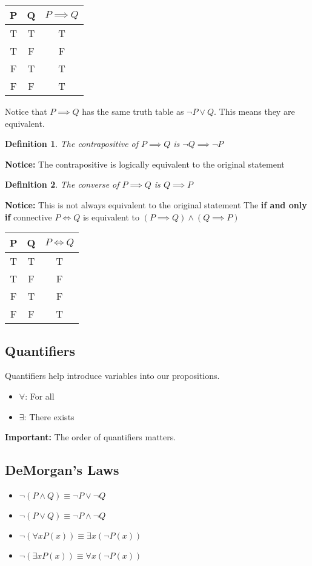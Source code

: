 \documentclass{article}
\newtheorem{definition}{Definition}
\begin{document}
\begin{center}
    \begin{tabular}{c|c|c} 
     P & Q & $P \implies Q$ \\
     \hline
     T & T & T \\ 
     T & F & F \\
     F & T & T \\
     F & F & T \\ 

    \end{tabular}
\end{center}
Notice that $P \implies Q$ has the same truth table as $\lnot P \lor Q$. This means they are equivalent.
\begin{definition}
    The contrapositive of $P \implies Q$ is $\lnot Q \implies \lnot P$
\end{definition}
\textbf{Notice: }The contrapositive is logically equivalent to the original statement
\begin{definition}
    The converse of $P \implies Q$ is $Q \implies P$
\end{definition}
\textbf{Notice: }This is not always equivalent to the original statement
The \textbf{if and only if} connective $P \iff Q$ is equivalent to $(P \implies Q) \land (Q \implies P)$
\begin{center}
    \begin{tabular}{c|c|c} 
     P & Q & $P \iff Q$ \\
     \hline
     T & T & T \\ 
     T & F & F \\
     F & T & F \\
     F & F & T \\ 
    \end{tabular}
\end{center}
\subsection{Quantifiers}
Quantifiers help introduce variables into our propositions.
\begin{itemize}
    \item $\forall$: For all
    \item $\exists$: There exists
\end{itemize}
\textbf{Important: }The order of quantifiers matters.
\subsection{DeMorgan's Laws}
\begin{itemize}
    \item $\lnot(P \land Q) \equiv \lnot P \lor \lnot Q$
    \item $\lnot(P \lor Q) \equiv \lnot P \land \lnot Q$
    \item $\lnot(\forall x P(x)) \equiv \exists x (\lnot P(x))$
    \item $\lnot(\exists x P(x)) \equiv \forall x (\lnot P(x))$
\end{itemize}
\end{document}
